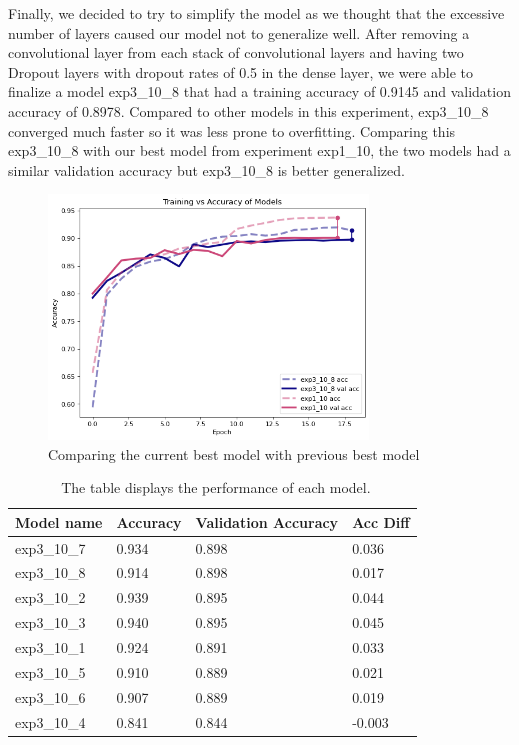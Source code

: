 \documentclass[twoside,twocolumn,9pt]{article}
\begin{document}
\noindent Finally, we decided to try to simplify the model as we thought that the excessive number of layers caused our model not to generalize well. After removing a convolutional layer from each stack of convolutional layers and having two Dropout layers with dropout rates of 0.5 in the dense layer, we were able to finalize a model exp3\_10\_8 that had a training accuracy of 0.9145 and validation accuracy of 0.8978. Compared to other models in this experiment, exp3\_10\_8 converged much faster so it was less prone to overfitting. Comparing this exp3\_10\_8 with our best model from experiment exp1\_10, the two models had a similar validation accuracy but exp3\_10\_8 is better generalized.

\begin{figure}[h]
\centering
  \includegraphics[height=6.5cm]{images/exp3}
  \caption{Comparing the current best model with previous best model}
  \label{fgr:example}
\end{figure}

\begin{table}[h]
\small
  \caption{\ The table displays the performance of each model.}
  \label{tbl:example1}
  \begin{tabular*}{0.48\textwidth}{@{\extracolsep{\fill}}llll}
    \hline
    Model name & Accuracy & Validation Accuracy & Acc Diff\\
    \hline
    exp3\_10\_7 & 0.934 & 0.898 & 0.036\\
    exp3\_10\_8 & 0.914 & 0.898 & 0.017\\
    exp3\_10\_2 & 0.939 & 0.895 & 0.044\\
    exp3\_10\_3 & 0.940 & 0.895 & 0.045\\
    exp3\_10\_1 & 0.924 & 0.891 & 0.033\\
    exp3\_10\_5 & 0.910 & 0.889 & 0.021\\
    exp3\_10\_6 & 0.907 & 0.889 & 0.019\\
    exp3\_10\_4 & 0.841 & 0.844 & -0.003\\
    \hline
  \end{tabular*}
\end{table}
\end{document}
